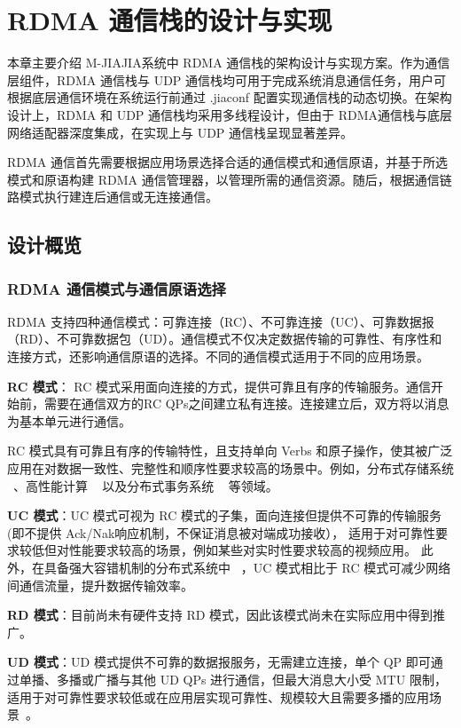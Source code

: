 \chapter{RDMA 通信栈的设计与实现}\label{chap:RJIAJIA}{
本章主要介绍 M-JIAJIA系统中 RDMA 通信栈的架构设计与实现方案。作为通信层组件，RDMA 通信栈与 UDP 通信栈均可用于完成系统消息通信任务，用户可根据底层通信环境在系统运行前通过 .jiaconf 配置实现通信栈的动态切换。在架构设计上，RDMA 和 UDP 通信栈均采用多线程设计，但由于 RDMA通信栈与底层网络适配器深度集成，在实现上与 UDP 通信栈呈现显著差异。

RDMA 通信首先需要根据应用场景选择合适的通信模式和通信原语，并基于所选模式和原语构建 RDMA 通信管理器，以管理所需的通信资源。随后，根据通信链路模式执行建连后通信或无连接通信。

\section{设计概览}

\subsection{RDMA 通信模式与通信原语选择}
RDMA 支持四种通信模式：可靠连接（RC）、不可靠连接（UC）、可靠数据报（RD）、不可靠数据包（UD）。通信模式不仅决定数据传输的可靠性、有序性和连接方式，还影响通信原语的选择。不同的通信模式适用于不同的应用场景。

\textbf{RC 模式}： RC 模式采用面向连接的方式，提供可靠且有序的传输服务。通信开始前，需要在通信双方的RC QPs之间建立私有连接。连接建立后，双方将以消息为基本单元进行通信。

RC 模式具有可靠且有序的传输特性，且支持单向 Verbs 和原子操作，使其被广泛应用在对数据一致性、完整性和顺序性要求较高的场景中。例如，分布式存储系统 ~\citep{christopher2013pilaf, drago2014farm, xingda2020xstore}、高性能计算 ~\citep{graham2005OpenMPI, Huang2006MVAPICH2} 以及分布式事务系统 ~\citep{xingda2018DrTM+H} 等领域。

\textbf{UC 模式}：UC 模式可视为 RC 模式的子集，面向连接但提供不可靠的传输服务(即不提供 Ack/Nak响应机制，不保证消息被对端成功接收），
适用于对可靠性要求较低但对性能要求较高的场景，例如某些对实时性要求较高的视频应用。
此外，在具备强大容错机制的分布式系统中 ~\citep{kalia2014herd}，UC 模式相比于 RC 模式可减少网络间通信流量，提升数据传输效率。

\textbf{RD 模式}：目前尚未有硬件支持 RD 模式，因此该模式尚未在实际应用中得到推广。

\textbf{UD 模式}：UD 模式提供不可靠的数据报服务，无需建立连接，单个 QP 即可通过单播、多播或广播与其他 UD QPs 进行通信，但最大消息大小受 MTU 限制，适用于对可靠性要求较低或在应用层实现可靠性、规模较大且需要多播的应用场景~\citep{kalia2014herd,kalia2016fasst}。

}
